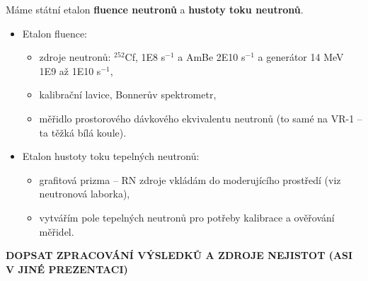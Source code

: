 Máme státní etalon \textbf{fluence neutronů} a \textbf{hustoty toku neutronů}.

\begin{itemize}
    \item Etalon fluence:
    \begin{itemize}
        \item zdroje neutronů: $^{252}$Cf, 1E8 s$^{-1}$ a AmBe 2E10 s$^{-1}$ a generátor 14 MeV 1E9 až 1E10 s$^{-1}$,
        \item kalibrační lavice, Bonnerův spektrometr,
        \item měřidlo prostorového dávkového ekvivalentu neutronů (to samé na VR-1 -- ta těžká bílá koule).
    \end{itemize}

    \item Etalon hustoty toku tepelných neutronů:
    \begin{itemize}
        \item grafitová prizma -- RN zdroje vkládám do moderujícího prostředí (viz neutronová laborka),
        \item vytvářím pole tepelných neutronů pro potřeby kalibrace a ověřování měřidel.
    \end{itemize}
\end{itemize}

\textbf{DOPSAT ZPRACOVÁNÍ VÝSLEDKŮ A ZDROJE NEJISTOT (ASI V JINÉ PREZENTACI)}



